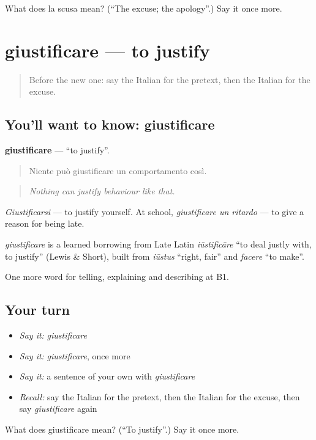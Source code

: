 \begin{tcolorbox}[breakable,colback=teal!4,colframe=teal!35!black,title={Before you move on}]
What does la scusa mean? (\textquotedblleft{}The excuse; the apology\textquotedblright{}.) Say it once more.
\end{tcolorbox}
\section[giustificare]{giustificare — to justify}

\label{lesson:IT-C353-giustificare}



\begin{quote}
Before the new one: say the Italian for the pretext, then the Italian for the excuse.
\end{quote}

\subsection*{You'll want to know: giustificare}
\textbf{giustificare} — \textquotedblleft{}to justify\textquotedblright{}.

\begin{quote}
Niente può giustificare un comportamento così.
\end{quote}

\begin{quote}
\emph{Nothing can justify behaviour like that.}
\end{quote}

\emph{Giustificarsi} — to justify yourself. At school, \emph{giustificare un ritardo} — to give a reason for being late.

\begin{cousinweb}
\emph{giustificare} is a learned borrowing from Late Latin \emph{iūstificāre} \textquotedblleft{}to deal justly with, to justify\textquotedblright{} (Lewis \& Short), built from \emph{iūstus} \textquotedblleft{}right, fair\textquotedblright{} and \emph{facere} \textquotedblleft{}to make\textquotedblright{}.
\end{cousinweb}

\begin{grammarlens}[title={What you've built}]
One more word for telling, explaining and describing at B1.
\end{grammarlens}

\subsection*{Your turn}
\begin{itemize}
\raggedright
  \item \emph{Say it:} \emph{giustificare}
  \item \emph{Say it:} \emph{giustificare}, once more
  \item \emph{Say it:} a sentence of your own with \emph{giustificare}
  \item \emph{Recall:} say the Italian for the pretext, then the Italian for the excuse, then say \emph{giustificare} again
\end{itemize}

\begin{tcolorbox}[breakable,colback=teal!4,colframe=teal!35!black,title={Before you move on}]
What does giustificare mean? (\textquotedblleft{}To justify\textquotedblright{}.) Say it once more.
\end{tcolorbox}
